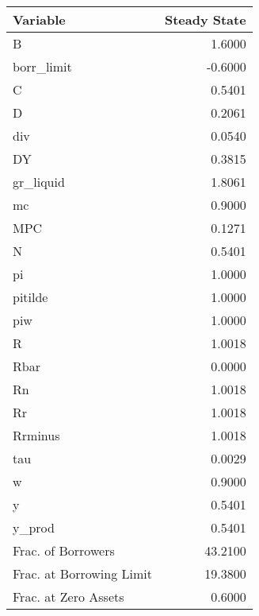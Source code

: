 \begin{table}
\centering
\label{tab:stst}
\begin{tabular}{lr}
\toprule
                Variable &  Steady State \\
\midrule
                       B &        1.6000 \\
              borr\_limit &       -0.6000 \\
                       C &        0.5401 \\
                       D &        0.2061 \\
                     div &        0.0540 \\
                      DY &        0.3815 \\
               gr\_liquid &        1.8061 \\
                      mc &        0.9000 \\
                     MPC &        0.1271 \\
                       N &        0.5401 \\
                      pi &        1.0000 \\
                 pitilde &        1.0000 \\
                     piw &        1.0000 \\
                       R &        1.0018 \\
                    Rbar &        0.0000 \\
                      Rn &        1.0018 \\
                      Rr &        1.0018 \\
                 Rrminus &        1.0018 \\
                     tau &        0.0029 \\
                       w &        0.9000 \\
                       y &        0.5401 \\
                  y\_prod &        0.5401 \\
      Frac. of Borrowers &       43.2100 \\
Frac. at Borrowing Limit &       19.3800 \\
    Frac. at Zero Assets &        0.6000 \\
\bottomrule
\end{tabular}
\end{table}
